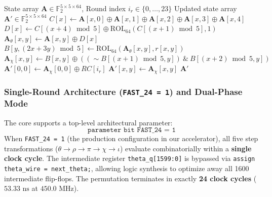 \begin{algorithm}[!t]
\caption{Single-Round Keccak-$f[1600]$ Transformation $\text{Rnd}(\mathbf{A}, i_r)$}
\label{alg:keccak_round}
\begin{algorithmic}[1]
\Require State array $\mathbf{A} \in \mathbb{F}_2^{5 \times 5 \times 64}$, Round index $i_r \in \{0, \dots, 23\}$
\Ensure Updated state array $\mathbf{A}' \in \mathbb{F}_2^{5 \times 5 \times 64}$
 
    \State $C[x] \leftarrow \mathbf{A}[x, 0] \oplus \mathbf{A}[x, 1] \oplus \mathbf{A}[x, 2] \oplus \mathbf{A}[x, 3] \oplus \mathbf{A}[x, 4]$
\EndFor
{} 
    \State $D[x] \leftarrow C[(x+4) \bmod 5] \oplus \text{ROL}_{64}(C[(x+1) \bmod 5], 1)$
\EndFor
{} 
    \State $\mathbf{A}_\theta[x, y] \leftarrow \mathbf{A}[x, y] \oplus D[x]$
\EndFor
{} 
    \State $B[y, (2x + 3y) \bmod 5] \leftarrow \text{ROL}_{64}(\mathbf{A}_\theta[x, y], r[x, y])$
\EndFor
{} 
    \State $\mathbf{A}_\chi[x, y] \leftarrow B[x, y] \oplus ((\sim B[(x+1) \bmod 5, y]) \ \& \ B[(x+2) \bmod 5, y])$
\EndFor
\State $\mathbf{A}'[0, 0] \leftarrow \mathbf{A}_\chi[0, 0] \oplus RC[i_r]$ 
    \State $\mathbf{A}'[x, y] \leftarrow \mathbf{A}_\chi[x, y]$
\EndFor
\State \Return $\mathbf{A}'$
\end{algorithmic}
\end{algorithm}

\subsubsection{Single-Round Architecture (\texttt{FAST\_24 = 1}) and Dual-Phase Mode}
The core supports a top-level architectural parameter:
\begin{equation}
\texttt{parameter bit FAST\_24 = 1}
\end{equation}
When \texttt{FAST\_24 = 1} (the production configuration in our accelerator), all five step transformations ($\theta \to \rho \to \pi \to \chi \to \iota$) evaluate combinatorially within a \textbf{single clock cycle}. The intermediate register \texttt{theta\_q[1599:0]} is bypassed via \texttt{assign theta\_wire = next\_theta;}, allowing logic synthesis to optimize away all 1600 intermediate flip-flops. The permutation terminates in exactly \textbf{24 clock cycles} ($53.33\text{ ns}$ at $450.0\text{ MHz}$).


